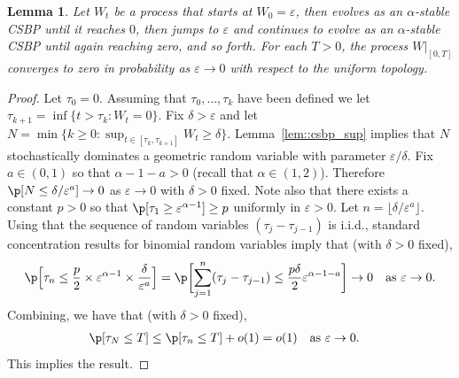 \documentclass[10pt]{amsart}
\let\epsilon\varepsilon
\theoremstyle{plain}
\numberwithin{theorem}{section}
\newtheorem{lemma}[theorem]{Lemma}
\theoremstyle{definition}
\begin{document}
\begin{lemma}
\label{lem::noreflectedcsbp}
Let $W_t$ be a process that starts at $W_0 = \epsilon$, then evolves as an $\alpha$-stable CSBP until it reaches $0$, then jumps to $\epsilon$ and continues to evolve as an $\alpha$-stable CSBP until again reaching zero, and so forth. For each $T > 0$, the process $W|_{[0,T]}$ converges to zero in probability as $\epsilon \to 0$ with respect to the uniform topology.
\end{lemma}
\begin{proof}
Let $\tau_0 = 0$. Assuming that $\tau_0,\ldots,\tau_k$ have been defined we let $\tau_{k+1} = \inf\{t > \tau_k : W_t = 0\}$. Fix $\delta > \epsilon$ and let $N = \min\{k \geq 0 : \sup_{t \in [\tau_k,\tau_{k+1}]} W_t \geq \delta\}$. Lemma~\ref{lem::csbp_sup} implies that $N$ stochastically dominates a geometric random variable with parameter $\epsilon/\delta$. Fix $a \in (0,1)$ so that $\alpha-1-a>0$ (recall that $\alpha \in (1,2)$). Therefore $\p[ N \leq \delta/\epsilon^a] \to 0$ as $\epsilon \to 0$ with $\delta > 0$ fixed. Note also that there exists a constant $p > 0$ so that $\p[ \tau_1 \geq \epsilon^{\alpha-1}] \geq p$ uniformly in $\epsilon > 0$. Let $n = \lfloor \delta/\epsilon^a \rfloor$. Using that the sequence of random variables $(\tau_j-\tau_{j-1})$ is i.i.d., standard concentration results for binomial random variables imply that (with $\delta > 0$ fixed),
\[
\p\Bigl[ \tau_n \leq \frac{p}{2} \times \epsilon^{\alpha-1} \times \frac{\delta}{\epsilon^a} \Bigr] = \p\biggl[ \sum_{j=1}^n (\tau_j-\tau_{j-1}) \leq \frac{p \delta}{2} \epsilon^{\alpha-1-a} \biggr] \to 0 \quad\text{as $\textstyle \epsilon \to 0$}.
\]
Combining, we have that (with $\delta > 0$ fixed),
\begin{align*}
\p[ \tau_N \leq T]
&\leq \p[ \tau_n \leq T] + o(1) = o(1) \quad\text{as $\textstyle \epsilon \to 0$}.
\end{align*}
This implies the result.
\end{proof}
\end{document}
